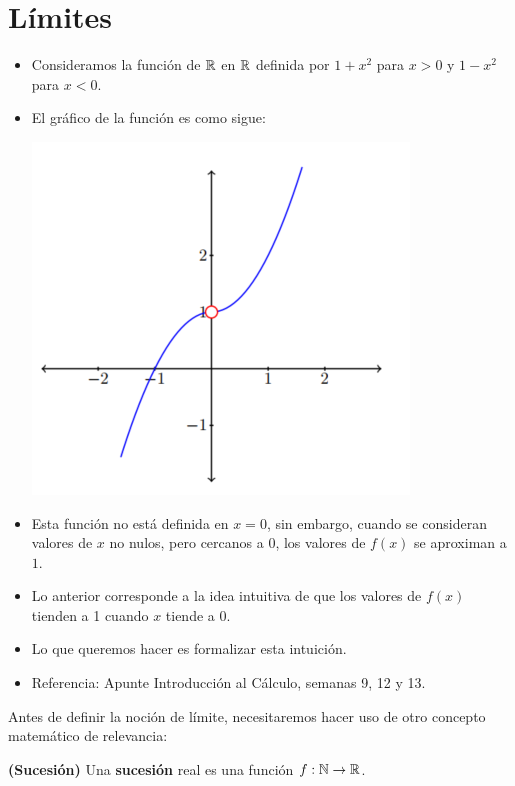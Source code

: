 
\section{Límites}

\begin{itemize}	
	\item Consideramos la función de $\mathbb{R}$ en $\mathbb{R}$ definida por $1 + x^2$ para $x > 0$ y $1 - x^2$ para $x < 0$. 
	\item El gráfico de la función es como sigue: 
	\begin{center}
		\includegraphics[scale=0.5]{figuras/capitulo1/04-limites/intro.png}
	\end{center}
	\item Esta función no está definida en $x=0$, sin embargo, cuando se consideran valores de $x$ no nulos, pero cercanos a 0, los valores de $f(x)$ se aproximan a $1$. 
	\item Lo anterior corresponde a la idea intuitiva de que los valores de $f(x)$ tienden a 1 cuando $x$ tiende a 0. 
	\item Lo que queremos hacer es formalizar esta intuición. 
	\item Referencia: Apunte Introducción al Cálculo, semanas 9, 12 y 13. 
\end{itemize}

	Antes de definir la noción de límite, necesitaremos hacer uso de otro concepto matemático de relevancia: 

\begin{definicion}
	\textbf{(Sucesión)}
	Una \textbf{sucesión} real es una función $f: \mathbb{N} \rightarrow \mathbb{R}$. 
\end{definicion}
 
